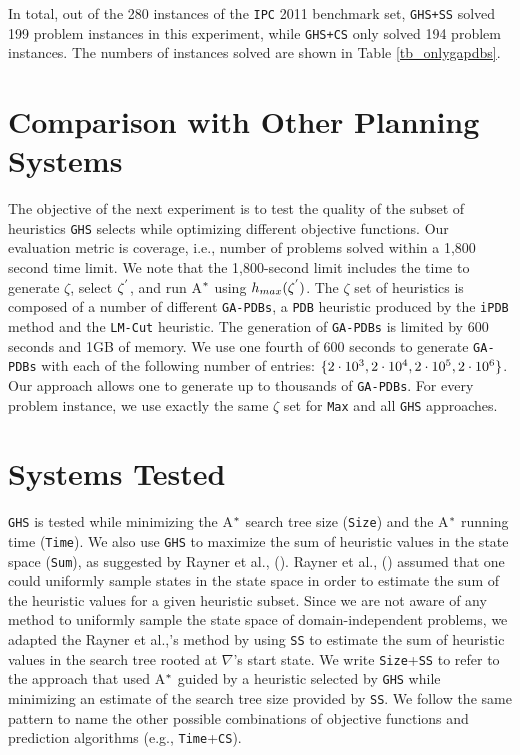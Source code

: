 In total, out of the 280 instances of the \texttt{IPC} 2011 benchmark set, \texttt{GHS+SS} solved 199 problem instances in this experiment, while \texttt{GHS+CS} only solved 194 problem instances. The numbers of instances solved are shown in Table \ref{tb_onlygapdbs}.

\section{Comparison with Other Planning Systems}

\noindent
The objective of the next experiment is to test the quality of the subset of heuristics \texttt{GHS} selects while optimizing different objective functions. Our evaluation metric is coverage, i.e., number of problems solved within a 1,800 second time limit. We note that the 1,800-second limit includes the time to generate $\zeta$, select $\zeta\sp{'}$, and run A$\sp{*}$ using $h_{max}(\zeta\sp{'})$. The $\zeta$ set of heuristics is composed of a number of different \texttt{GA-PDBs}, a \texttt{PDB} heuristic produced by the \texttt{iPDB} method and the \texttt{LM-Cut} heuristic. The generation of \texttt{GA-PDBs} is limited by 600 seconds and 1GB of memory. We use one fourth of 600 seconds to generate \texttt{GA-PDBs} with each of the following number of entries: $\{2 \cdot 10\sp{3}, 2 \cdot 10\sp{4}, 2 \cdot 10\sp{5}, 2 \cdot 10\sp{6}\}$. Our approach allows one to generate up to thousands of \texttt{GA-PDBs}. For every problem instance, we use exactly the same $\zeta$ set for \texttt{Max} and all \texttt{GHS} approaches.

\section{Systems Tested}

\noindent
\texttt{GHS} is tested while minimizing the A$\sp{*}$ search tree size (\texttt{Size}) and the A$\sp{*}$ running time (\texttt{Time}). We also use \texttt{GHS} to maximize the sum of heuristic values in the state space (\texttt{Sum}), as suggested by Rayner et al., (\citeyear{raynersss13}). Rayner et al., (\citeyear{raynersss13}) assumed that one could uniformly sample states in the state space in order to estimate the sum of the heuristic values for a given heuristic subset. Since we are not aware of any method to uniformly sample the state space of domain-independent problems, we adapted the Rayner et al.,'s method by using \texttt{SS} to estimate the sum of heuristic values in the search tree rooted at $\nabla$'s start state. We write \texttt{Size}+\texttt{SS} to refer to the approach that used A$\sp{*}$ guided by a heuristic selected by \texttt{GHS} while minimizing an estimate of the search tree size provided by \texttt{SS}. We follow the same pattern to name the other possible combinations of objective functions and prediction algorithms (e.g., \texttt{Time}+\texttt{CS}).

